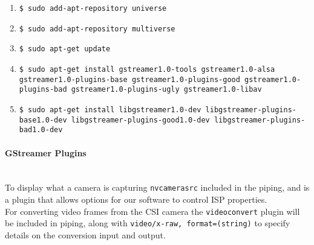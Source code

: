 \documentclass[letterpaper,10pt,serif,draftclsnofoot,onecolumn,compsoc,titlepage]{IEEEtran}
\begin{document}
	\begin{enumerate}
		\item\texttt{\$ sudo add-apt-repository universe} \\
		\item\texttt{\$ sudo add-apt-repository multiverse} \\
		\item\texttt{\$ sudo apt-get update} \\
		\item\texttt{\$ sudo apt-get install gstreamer1.0-tools gstreamer1.0-alsa 
			gstreamer1.0-plugins-base \newline gstreamer1.0-plugins-good 
			gstreamer1.0-plugins-bad gstreamer1.0-plugins-ugly \newline
			gstreamer1.0-libav} \\
		\item\texttt{\$ sudo apt-get install libgstreamer1.0-dev libgstreamer-plugins-base1.0-dev \newline
		libgstreamer-plugins-good1.0-dev libgstreamer-plugins-bad1.0-dev} \\
	\end{enumerate}

\paragraph{GStreamer Plugins}\mbox{} \\ 

To display what a camera is capturing \texttt{nvcamerasrc} included in the piping, 
and is a plugin that allows options for our software to control ISP properties. \\

For converting video frames from the CSI camera the \texttt{videoconvert} plugin will 
be included in piping, along with \texttt{video/x-raw, format=(string){}} to specify 
details on the conversion input and output. \\


\nocite{*}
%
%
\end{document}
